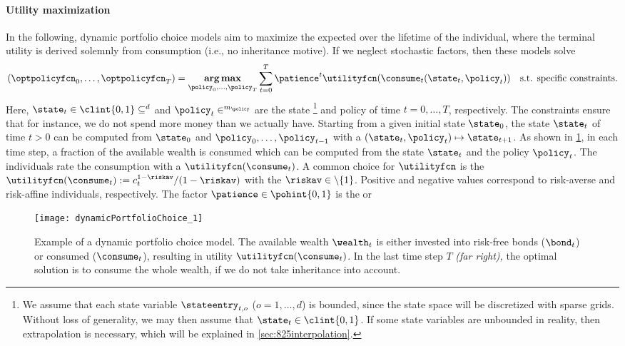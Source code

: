 \paragraph{Utility maximization}

In the following, dynamic portfolio choice models aim to maximize the expected
 over the lifetime of the individual,
where the terminal utility is derived solemnly from consumption
(i.e., no inheritance motive).
If we neglect stochastic factors, then these models solve
\begin{equation}
  \label{eq:utilityMaximization}
  (\optpolicyfcn_0, \dotsc, \optpolicyfcn_T)
  = \vecargmax_{\policy_0, \dotsc, \policy_T}
  \sum_{t=0}^T \patience^t \utilityfcn(\consume_t(\state_t, \policy_t))
  \quad\text{s.t. specific constraints.}
\end{equation}
Here, $\state_t \in \clint{\*0, \*1} \subset \real^d$ and
$\policy_t \in \real^{m_{\policy}}$
are the state%
\footnote{%
  We assume that each state variable $\stateentry_{t,o}$ ($o = 1, \dotsc, d$)
  is bounded, since the state space will be discretized with sparse grids.
  Without loss of generality, we may then assume that
  $\state_t \in \clint{\*0, \*1}$.
  If some state variables are unbounded in reality,
  then extrapolation is necessary,
  which will be explained in \cref{sec:825interpolation}.%
}
and policy of time $t = 0, \dotsc, T$, respectively.
The constraints ensure that for instance, we do not spend more money
than we actually have.
Starting from a given initial state $\state_0$,
the state $\state_t$ of time $t > 0$ can be computed from
$\state_0$ and $\policy_0, \dotsc, \policy_{t-1}$ with a
 $(\state_t, \policy_t) \mapsto \state_{t+1}$.
As shown in \cref{fig:dynamicPortfolioChoice},
in each time step, a fraction of the available wealth is consumed
which can be computed from the state $\state_t$ and the policy $\policy_t$.
The individuals rate the consumption with a 
$\utilityfcn(\consume_t)$.
A common choice for $\utilityfcn$ is the 
$\utilityfcn(\consume_t) := c_t^{1-\riskav}/(1-\riskav)$
with the  $\riskav \in \real \setminus \{1\}$.
Positive and negative values correspond to risk-averse and risk-affine
individuals, respectively.
The factor $\patience \in \pohint{0, 1}$ is the 
or 

\begin{SCfigure}
  \texttt{[image: dynamicPortfolioChoice\_1]}%
  \caption[Example of a dynamic portfolio choice model]{%
    Example of a dynamic portfolio choice model.
    The available wealth $\wealth_t$ is either
    invested into risk-free bonds ($\bond_t$) or consumed ($\consume_t$),
    resulting in utility $\utilityfcn(\consume_t)$.
    In the last time step $T$ \emph{(far right),}
    the optimal solution is to consume the whole wealth,
    if we do not take inheritance into account.%
  }%
  \label{fig:dynamicPortfolioChoice}%
\end{SCfigure}

